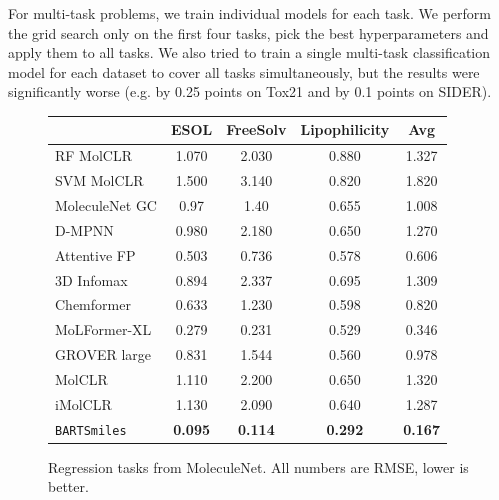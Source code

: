 \documentclass{article} %
\newcommand{\MODEL}{\texttt{BARTSmiles}}
\begin{document}
For multi-task problems, we train individual models for each task. We perform the grid search only on the first four tasks, pick the best hyperparameters and apply them to all tasks. We also tried to train a single multi-task classification model for each dataset to cover all tasks simultaneously, but the results were significantly worse (e.g. by 0.25 points on Tox21 and by 0.1 points on SIDER). 

\begin{table}[h]
\centering\scriptsize
\begin{subfigure}{.56\textwidth}
\centering
\begin{tabular}{lcccc}
\toprule
        & ESOL       & FreeSolv   & Lipophilicity   & Avg \\ \midrule
RF MolCLR            & 1.070      & 2.030      & 0.880          & 1.327    \\
SVM MolCLR           & 1.500      & 3.140      & 0.820          & 1.820    \\ \midrule
MoleculeNet GC      & 0.97      & 1.40       & 0.655  & 1.008       \\
D-MPNN      & 0.980      & 2.180      & 0.650            & 1.270    \\
Attentive FP      & 0.503      & 0.736      & 0.578           & 0.606  \\
3D Infomax  & 0.894      & 2.337      & 0.695    & 1.309      \\
\midrule
Chemformer  & 0.633      & 1.230      & 0.598           & 0.820     \\
MoLFormer-XL      & 0.279      & 0.231      & 0.529           & 0.346 \\ GROVER large      & 0.831      & 1.544      & 0.560           & 0.978 \\
MolCLR            & 1.110      & 2.200      & 0.650           & 1.320    \\
iMolCLR           & 1.130      & 2.090      & 0.640           & 1.287    \\ \midrule
\MODEL{}     &  \textbf{0.095}          &  \textbf{0.114}          &   \textbf{0.292}           & \textbf{0.167} \\ \bottomrule
\end{tabular}
\caption{Regression tasks from MoleculeNet. All numbers are RMSE, lower is better. }
\label{tab:results-regression}
\end{subfigure}\qquad
\begin{subfigure}{.4\textwidth}
\centering
\begin{tabular}{lr}

\end{tabular}
\end{subfigure}
\end{table}
\end{document}
